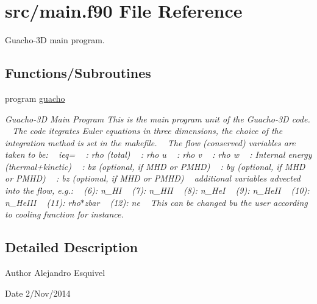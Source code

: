 \hypertarget{main_8f90}{}\section{src/main.f90 File Reference}
\label{main_8f90}


Guacho-\/3\+D main program.  


\subsection*{Functions/\+Subroutines}
\begin{DoxyCompactItemize}
\item 
\hypertarget{main_8f90_a685bddead5d9dcd4492c9cf9c60614a5}{}program \hyperlink{main_8f90_a685bddead5d9dcd4492c9cf9c60614a5}{guacho}\label{main_8f90_a685bddead5d9dcd4492c9cf9c60614a5}

\begin{DoxyCompactList}\small\item\em Guacho-\/3\+D Main Program This is the main program unit of the Guacho-\/3\+D code. ~\newline
 The code itegrates Euler equations in three dimensions, the choice of the integration method is set in the makefile. ~\newline
 The flow (conserved) variables are taken to be\+: ~\newline
 ieq= ~ \+: rho (total) ~ \+: rho u ~ \+: rho v ~ \+: rho w ~ \+: Internal energy (thermal+kinetic) ~ \+: bx (optional, if M\+H\+D or P\+M\+H\+D) ~ \+: by (optional, if M\+H\+D or P\+M\+H\+D) ~ \+: bz (optional, if M\+H\+D or P\+M\+H\+D) ~\newline
 additional variables advected into the flow, e.\+g.\+: ~ (6)\+: n\+\_\+\+H\+I ~ (7)\+: n\+\_\+\+H\+I\+I ~ (8)\+: n\+\_\+\+He\+I ~ (9)\+: n\+\_\+\+He\+I\+I ~ (10)\+: n\+\_\+\+He\+I\+I\+I ~ (11)\+: rho$\ast$zbar ~ (12)\+: ne ~\newline
 This can be changed bu the user according to cooling function for instance. \end{DoxyCompactList}\end{DoxyCompactItemize}


\subsection{Detailed Description}
\begin{DoxyAuthor}{Author}
Alejandro Esquivel 
\end{DoxyAuthor}
\begin{DoxyDate}{Date}
2/\+Nov/2014 
\end{DoxyDate}
